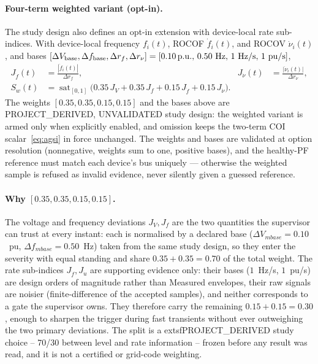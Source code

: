 \documentclass[12pt,a4paper]{article}
\DeclareMathOperator{\sat}{sat}
\newcommand{\pu}{\ifmmode\,\mathrm{p.u.}\else\ p.u.\fi}
\begin{document}
\paragraph{Four-term weighted variant (opt-in).}
The study design also defines an opt-in extension with device-local rate
sub-indices.  With device-local frequency $f_i(t)$, ROCOF
$\dot f_i(t)$, and ROCOV $\dot\nu_i(t)$, and bases
$[\Delta V_{\rm base},\Delta f_{\rm base},\Delta r_{f},\Delta r_{\nu}]
=[0.10\pu,\,0.50~\mathrm{Hz},\,1~\mathrm{Hz/s},\,1~\mathrm{pu/s}]$,
\begin{equation}
\begin{aligned}
  J_{\dot f}(t)&=\frac{|\dot f_i(t)|}{\Delta r_{f}},&
  J_{\dot\nu}(t)&=\frac{|\dot\nu_i(t)|}{\Delta r_{\nu}},\\
  S_{w}(t)&=\sat_{[0,1]}\!\bigl(
      0.35\,J_V+0.35\,J_f+0.15\,J_{\dot f}+0.15\,J_{\dot\nu}\bigr).&&
\end{aligned}
\label{eq:weighted}
\end{equation}
The weights $[0.35,0.35,0.15,0.15]$ and the bases above are
\textsf{PROJECT\_DERIVED, UNVALIDATED} study design: the weighted variant is
armed only when explicitly enabled, and omission keeps the two-term
COI scalar~\eqref{eq:agsi} in force unchanged.  The weights and bases are
validated at option resolution (nonnegative, weights sum to one, positive
bases), and the healthy-PF reference must match each device's bus uniquely ---
otherwise the weighted sample is refused as invalid evidence, never silently
given a guessed reference.

\paragraph{Why $[0.35,0.35,0.15,0.15]$.}
The voltage and frequency deviations $J_V,J_f$ are the two quantities the
supervisor can trust at every instant: each is normalised by a declared base
($\Delta V_{
m base}=0.10$~pu, $\Delta f_{
m base}=0.50$~Hz) taken from the
same study design, so they enter the severity with equal standing and share
$0.35+0.35=0.70$ of the total weight.  The rate sub-indices $J_{\dot f},
J_{\dot
u}$ are supporting evidence only: their bases ($1$~Hz/s, $1$~pu/s)
are design orders of magnitude rather than Measured envelopes, their raw
signals are noisier (finite-difference of the accepted samples), and neither
corresponds to a gate the supervisor owns.  They therefore carry the remaining
$0.15+0.15=0.30$, enough to sharpen the trigger during fast transients without
ever outweighing the two primary deviations.  The split is a
	extsf{PROJECT\_DERIVED} study choice -- 70/30 between level and rate
information -- frozen before any result was read, and it is not a certified
or grid-code weighting.
\end{document}

